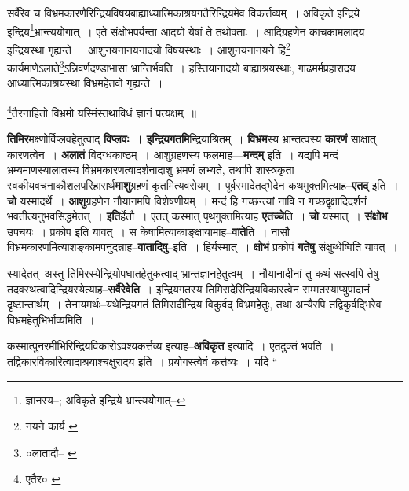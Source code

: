 \documentclass[article,12pt,a4paper]{memoir}
\begin{document}
	  \pstart सर्वैरेव च विभ्रमकारणैरिन्द्रियविषयबाह्याध्यात्मिकाश्रयगतैरिन्द्रियमेव विकर्त्तव्यम् । अविकृते इन्द्रिये इन्द्रिय\footnote{ज्ञानस्य--\cite{dp-msD-n}; अविकृते इन्द्रिये भ्रान्त्ययोगात्--\cite{dp-msB}}भ्रान्त्ययोगात् । एते संक्षोभपर्यन्ता आदयो येषां ते तथोक्ताः । आदिग्रहणेन काचकामलादय इन्द्रियस्था गृह्यन्ते । आशुनयनानयनादयो विषयस्थाः । आशुनयनानयने हि\footnote{नयने कार्य \cite{dp-msB} \cite{dp-msD} \cite{dp-edN}} कार्यमाणेऽलाते\footnote{०लातादौ--\cite{dp-msA} \cite{dp-edP} \cite{dp-edH} \cite{dp-edN}}ऽन्निवर्णदण्डाभासा भ्रान्तिर्भवति । हस्तियानादयो बाह्याश्रयस्थाः, गाढमर्मप्रहारादय आध्यात्मिकाश्रयस्था विभ्रमहेतवो गृह्यन्ते ।
	\pend
       

	  \pstart \footnote{एतैर० \cite{dp-msB} \cite{dp-msD}}तैरनाहितो विभ्रमो यस्मिंस्तथाविधं ज्ञानं प्रत्यक्षम् ॥
	\pend
      
	  \endgroup
	

	  \pstart \textbf{तिमिर}मक्ष्णोर्विप्लवहेतुत्वाद् \textbf{विप्लवः । इन्द्रियगतमि}न्द्रियाश्रितम् । \textbf{विभ्रम}स्य भ्रान्तत्वस्य \textbf{कारणं} साक्षात् कारणत्वेन । \textbf{अलातं} विदग्धकाष्ठम् । आशुग्रहणस्य फलमाह—\textbf{मन्दम्} इति । यद्यपि मन्दं भ्रम्यमाणस्यालातस्य विभ्रमकारणत्वादर्शनादाशु भ्रमणं लभ्यते, तथापि शास्त्रकृता स्वकीयवचनाकौशलपरिहारार्थ\textbf{माशु}ग्रहणं कृतमित्यवसेयम् । पूर्वस्मादेतद्भेदेन कथमुक्तमित्याह--\textbf{एतद्} इति । \textbf{चो} यस्मादर्थे । \textbf{आशु}ग्रहणेन नौयानमपि विशेषणीयम् । मन्दं हि गच्छन्त्यां नावि न गच्छद्वृक्षादिदर्शनं भवतीत्यनुभवसिद्धमेतत् । \textbf{इति}र्हेतौ । एतत् कस्मात् पृथगुक्तमित्याह \textbf{एतच्चे}ति । \textbf{चो} यस्मात् । \textbf{संक्षोभ} उपचयः । प्रकोप इति यावत् । स केषामित्याकाङ्क्षायामाह--\textbf{वाते}ति । नासौ विभ्रमकारणमित्याशङ्कामपनुदन्नाह--\textbf{वातादिषु}--इति । हिर्यस्मात् । \textbf{क्षोभं} प्रकोपं \textbf{गतेषु} संक्षुब्धेष्विति यावत् ।
	\pend
      

	  \pstart स्यादेतत्--अस्तु तिमिरस्येन्द्रियोपघातहेतुकत्वाद् भ्रान्तज्ञानहेतुत्वम् । नौयानादीनां तु कथं सत्स्वपि तेषु तदवस्थत्वादिन्द्रियस्येत्याह--\textbf{सर्वैरेवेति} । इन्द्रियगतस्य तिमिरादेरिन्द्रियविकारत्वेन सम्मतस्याप्युपादानं दृष्टान्तार्थम् । तेनायमर्थः--यथेन्द्रियगतं तिमिरादीन्द्रिय विकुर्वद् विभ्रमहेतुः, तथा अन्यैरपि तद्विकुर्वद्भिरेव विभ्रमहेतुभिर्भाव्यमिति ।
	\pend
      

	  \pstart कस्मात्पुनरमीभिरिन्द्रियविकारोऽवश्यकर्त्तव्य इत्याह--\textbf{अविकृत} इत्यादि । एतदुक्तं भवति । तद्विकारविकारित्वादाश्रयाश्चक्षुरादय इति । प्रयोग\leavevmode{}स्त्वेवं कर्त्तव्यः । यदि  \leavevmode{} “
	  
\end{document}
